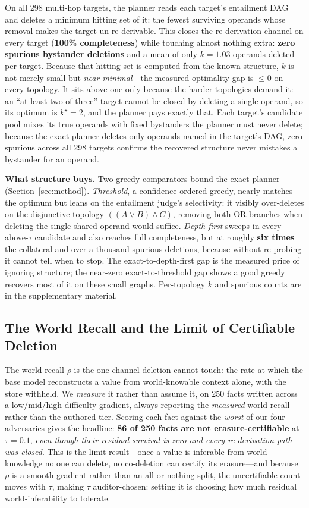\documentclass[letterpaper]{article}
\begin{document}
On all 298 multi-hop targets, the planner reads each target's entailment DAG and deletes a
minimum hitting set of it: the fewest surviving operands whose removal makes the
target un-re-derivable. This closes the re-derivation channel on every target
(\textbf{100\% completeness}) while touching almost nothing extra: \textbf{zero spurious
bystander deletions} and a mean of only \textbf{$k=1.03$} operands deleted per target.
Because that hitting set is computed from the known structure, $k$ is not merely small but
\emph{near-minimal}---the measured optimality gap is $\le0$ on every topology. It sits above one
only because the harder topologies demand it: an ``at least two of three'' target cannot be
closed by deleting a single operand, so its optimum is $k^\star{=}2$, and the planner pays
exactly that. Each target's candidate pool mixes its true operands with fixed bystanders
the planner must never delete; because the exact planner deletes only operands named in the
target's DAG, zero spurious across all 298 targets confirms the recovered structure never
mistakes a bystander for an operand.

\textbf{What structure buys.} Two greedy comparators bound the exact planner
(Section~\ref{sec:method}). \emph{Threshold}, a confidence-ordered greedy, nearly matches the
optimum but leans on the entailment judge's selectivity: it visibly over-deletes on the
disjunctive topology $((A\vee B)\wedge C)$, removing both OR-branches when deleting the
single shared operand would suffice. \emph{Depth-first} sweeps in every above-$\tau$
candidate and also reaches full completeness, but at roughly \textbf{six times} the
collateral and over a thousand spurious deletions, because without re-probing it cannot tell
when to stop. The exact-to-depth-first gap is the measured price of ignoring structure; the
near-zero exact-to-threshold gap shows a good greedy recovers most of it on these small
graphs. Per-topology $k$ and spurious counts are in the supplementary material.

\subsection{The World Recall and the Limit of Certifiable Deletion}\label{sec:res-rho}

The world recall $\rho$ is the one channel deletion cannot touch: the rate at which the
base model reconstructs a value from world-knowable context alone, with the store withheld.
We \emph{measure} it rather than assume it, on 250 facts written across a low/mid/high
difficulty gradient, always reporting the \emph{measured} world recall rather than the
authored tier. Scoring each fact against the \emph{worst} of our four adversaries gives the
headline: \textbf{86 of 250 facts are not erasure-certifiable} at $\tau{=}0.1$, \emph{even
though their residual survival is zero and every re-derivation path was closed}. This is the
limit result---once a value is inferable from world knowledge no one can delete, no
co-deletion can certify its erasure---and because $\rho$ is a smooth gradient rather than an
all-or-nothing split, the uncertifiable count moves with $\tau$, making $\tau$
auditor-chosen: setting it is choosing how much residual world-inferability to tolerate.
\end{document}
